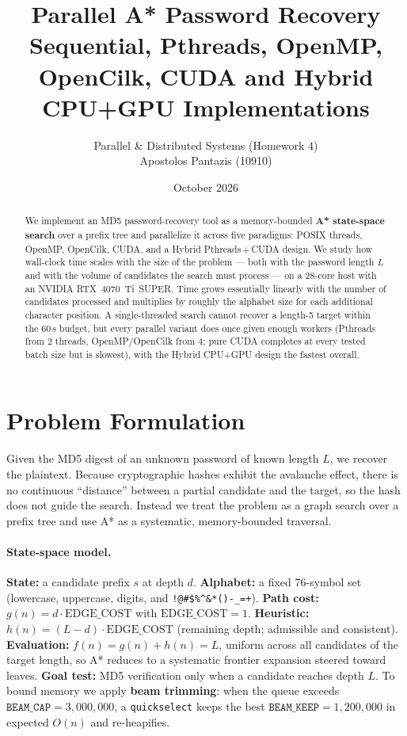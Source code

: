 \documentclass[11pt,a4paper]{article}
\title{\vspace{-1.0cm}\textbf{Parallel A* Password Recovery} \\[2pt]
       \large Sequential, Pthreads, OpenMP, OpenCilk, CUDA and Hybrid CPU+GPU Implementations}
\author{Parallel \& Distributed Systems (Homework 4) \\ Apostolos Pantazis (10910)}
\date{October 2026}
\begin{document}
\maketitle
\thispagestyle{fancy}
\vspace{-0.9cm}

\begin{abstract}
\noindent We implement an MD5 password-recovery tool as a memory-bounded \textbf{A* state-space
search} over a prefix tree and parallelize it across five paradigms: POSIX threads, OpenMP,
OpenCilk, CUDA, and a Hybrid Pthreads\,+\,CUDA design. We study how wall-clock time scales with the
size of the problem --- both with the password length $L$ and with the volume of candidates the
search must process --- on a 28-core host with an NVIDIA RTX~4070~Ti~SUPER. Time grows essentially
linearly with the number of candidates processed and multiplies by roughly the alphabet size for
each additional character position. A single-threaded search cannot recover a length-5 target within
the $60$\,s budget, but every parallel variant does once given enough workers (Pthreads from $2$
threads, OpenMP/OpenCilk from $4$; pure CUDA completes at every tested batch size but is slowest),
with the Hybrid CPU+GPU design the fastest overall.
\end{abstract}

\vspace{-0.3cm}
\section{Problem Formulation}
Given the MD5 digest of an unknown password of known length $L$, we recover the plaintext. Because
cryptographic hashes exhibit the avalanche effect, there is no continuous ``distance'' between a
partial candidate and the target, so the hash does not guide the search. Instead we treat the
problem as a graph search over a prefix tree and use A* as a systematic, memory-bounded traversal.

\paragraph{State-space model.}
\textbf{State:} a candidate prefix $s$ at depth $d$. \textbf{Alphabet:} a fixed 76-symbol set
(lowercase, uppercase, digits, and \verb|!@#$%^&*()-_=+|). \textbf{Path cost:}
$g(n)=d\cdot\text{EDGE\_COST}$ with $\text{EDGE\_COST}=1$. \textbf{Heuristic:}
$h(n)=(L-d)\cdot\text{EDGE\_COST}$ (remaining depth; admissible and consistent). \textbf{Evaluation:}
$f(n)=g(n)+h(n)=L$, uniform across all candidates of the target length, so A* reduces to a
systematic frontier expansion steered toward leaves. \textbf{Goal test:} MD5 verification only when
a candidate reaches depth $L$. To bound memory we apply \textbf{beam trimming}: when the queue
exceeds $\texttt{BEAM\_CAP}=3{,}000{,}000$, a \texttt{quickselect} keeps the best
$\texttt{BEAM\_KEEP}=1{,}200{,}000$ in expected $O(n)$ and re-heapifies.
\end{document}
